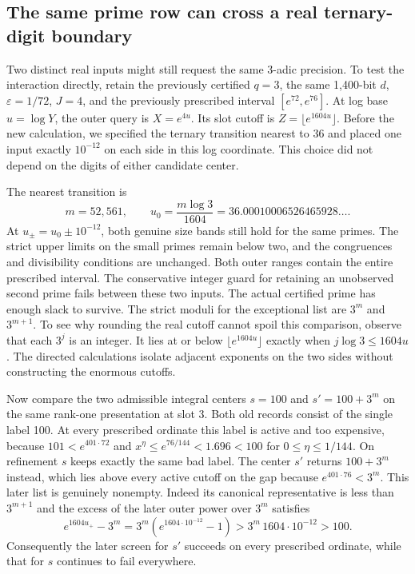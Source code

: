 \documentclass[12pt,letterpaper]{article}
\begin{document}
\subsection{The same prime row can cross a real ternary-digit boundary}
\label{sec:cross-digit}

Two distinct real inputs might still request the same 3-adic precision. To test the interaction directly, retain the previously certified \(q=3\), the same 1,400-bit \(d\), \(\varepsilon=1/72\), \(J=4\), and the previously prescribed interval \([e^{72},e^{76}]\). At log base \(u=\log Y\), the outer query is \(X=e^{4u}\). Its slot cutoff is \(Z=\lfloor e^{1604u}\rfloor\). Before the new calculation, we specified the ternary transition nearest to 36 and placed one input exactly \(10^{-12}\) on each side in this log coordinate. This choice did not depend on the digits of either candidate center.

The nearest transition is
\[
  m=52{,}561,\qquad u_0=\frac{m\log 3}{1604}
      =36.00010006526465928\ldots .
\]
At \(u_\pm=u_0\pm10^{-12}\), both genuine size bands still hold for the same primes. The strict upper limits on the small primes remain below two, and the congruences and divisibility conditions are unchanged. Both outer ranges contain the entire prescribed interval. The conservative integer guard for retaining an unobserved second prime fails between these two inputs. The actual certified prime has enough slack to survive. The strict moduli for the exceptional list are \(3^m\) and \(3^{m+1}\). To see why rounding the real cutoff cannot spoil this comparison, observe that each \(3^j\) is an integer. It lies at or below \(\lfloor e^{1604u}\rfloor\) exactly when \(j\log3\le1604u\). The directed calculations isolate adjacent exponents on the two sides without constructing the enormous cutoffs.

Now compare the two admissible integral centers \(s=100\) and \(s'=100+3^m\) on the same rank-one presentation at slot 3. Both old records consist of the single label 100. At every prescribed ordinate this label is active and too expensive, because \(101<e^{401\cdot72}\) and \(x^{\eta}\le e^{76/144}<1.696<100\) for \(0\le\eta\le1/144\). On refinement \(s\) keeps exactly the same bad label. The center \(s'\) returns \(100+3^m\) instead, which lies above every active cutoff on the gap because \(e^{401\cdot76}<3^m\). This later list is genuinely nonempty. Indeed its canonical representative is less than \(3^{m+1}\) and the excess of the later outer power over \(3^m\) satisfies
\[
 e^{1604u_+}-3^m
   =3^m(e^{1604\cdot10^{-12}}-1)
   >3^m\,1604\cdot10^{-12}>100 .
\]
Consequently the later screen for \(s'\) succeeds on every prescribed ordinate, while that for \(s\) continues to fail everywhere.
\end{document}
